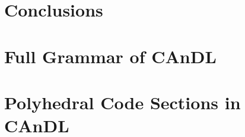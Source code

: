 \documentclass[phd,icsa,twoside,logo,11pt]{infthesis}
\begin{document}
%    

\chapter{Conclusions}
    \label{chapter:conclusion}
    




\begin{appendices}
\chapter{Full Grammar of CAnDL}
    \label{appendix:CAnDLgrammar}
    
\chapter{Polyhedral Code Sections in CAnDL}
    \label{appendix:CAnDLpoly}
    
\end{appendices}
\end{document}
